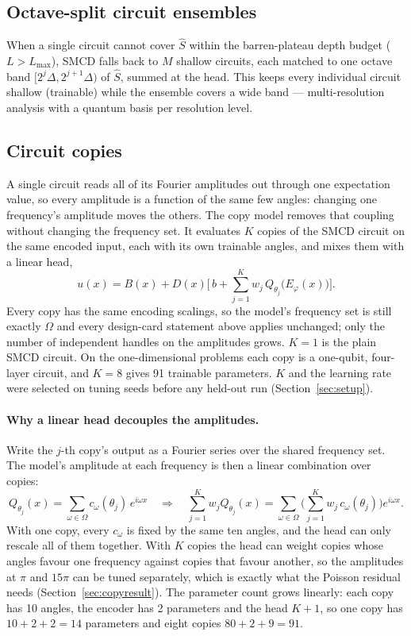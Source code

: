 \subsection{Octave-split circuit ensembles}
\label{sec:octave}

When a single circuit cannot cover $\hat S$ within the barren-plateau depth budget
($L>L_{\max}$), SMCD falls back to $M$ shallow circuits, each matched to one octave band
$[2^j\Delta, 2^{j+1}\Delta)$ of $\hat S$, summed at the head. This keeps every individual
circuit shallow (trainable) while the ensemble covers a wide band --- multi-resolution
analysis with a quantum basis per resolution level.

\subsection{Circuit copies}
\label{sec:copies}

A single circuit reads all of its Fourier amplitudes out through one expectation value,
so every amplitude is a function of the same few angles: changing one frequency's
amplitude moves the others. The copy model removes that coupling without changing the
frequency set. It evaluates $K$ copies of the SMCD circuit on the same encoded input,
each with its own trainable angles, and mixes them with a linear head,
\[
  u(x) = B(x) + D(x)\Big[\,b + \sum_{j=1}^{K} w_j\, Q_{\theta_j}\big(E_\varphi(x)\big)\Big].
\]
Every copy has the same encoding scalings, so the model's frequency set is still exactly
$\Omega$ and every design-card statement above applies unchanged; only the number of
independent handles on the amplitudes grows. $K=1$ is the plain SMCD circuit. On the
one-dimensional problems each copy is a one-qubit, four-layer circuit, and $K=8$ gives
91 trainable parameters. $K$ and the learning rate were selected on tuning seeds before
any held-out run (Section~\ref{sec:setup}).

\paragraph{Why a linear head decouples the amplitudes.} Write the $j$-th copy's output as
a Fourier series over the shared frequency set. The model's amplitude at each frequency is
then a linear combination over copies:
\[
  Q_{\theta_j}(x)=\sum_{\omega\in\Omega}c_\omega(\theta_j)\,e^{i\omega x}
  \quad\Longrightarrow\quad
  \sum_{j=1}^{K} w_j Q_{\theta_j}(x)=\sum_{\omega\in\Omega}\Big(\sum_{j=1}^{K} w_j\,c_\omega(\theta_j)\Big)e^{i\omega x}.
\] With one copy, every $c_\omega$ is fixed by the same ten angles,
and the head can only rescale all of them together. With $K$ copies the head can weight
copies whose angles favour one frequency against copies that favour another, so the
amplitudes at $\pi$ and $15\pi$ can be tuned separately, which is exactly what the
Poisson residual needs (Section~\ref{sec:copyresult}). The parameter count grows
linearly: each copy has 10 angles, the encoder has 2 parameters and the head $K+1$, so
one copy has $10+2+2=14$ parameters and eight copies $80+2+9=91$.

